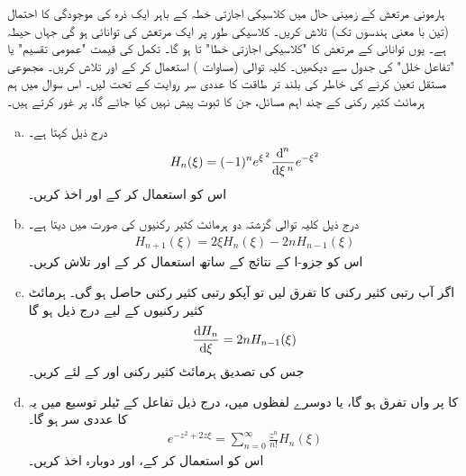 ہارمونی مرتعش کے زمینی حال میں کلاسیکی اجازتی خطہ کے باہر ایک ذرہ کی موجودگی کا احتمال (تین با معنی ہندسوں تک) تلاش کریں۔
 کلاسیکی طور پر ایک مرتعش کی توانائی  ہو گی جہاں  حیطہ ہے۔ یوں توانائی  کے مرتعش کا "کلاسیکی اجازتی خطا"  تا  ہو گا۔ تکمل کی قیمت "عمومی تقسیم" یا "تفاعل خلل" کی جدول سے دیکھیں۔
%
کلیہ توالی (مساوات ) استعمال کر کے  اور 
تلاش کریں۔ مجموعی مستقل تعین کرنے کی خاطر  کی بلند تر طاقت کا عددی سر روایت کے تحت  لیں۔
%
اس سوال میں ہم ہرمائٹ کثیر رکنی کے چند اہم مسائل، جن کا ثبوت پیش نہیں کیا جائے گا، پر غور کرتے ہیں۔
\begin{enumerate}[a.]
\item
{} درج ذیل کہتا ہے۔
\begin{align}
H_{n}(\xi)=(-1)^{n}e^{\xi^{\,2}}\frac{\dif^{\,n} }{\dif \xi^{\,n}}e^{-\xi^{2}}
\end{align}
اس کو استعمال کر کے  اور  اخذ کریں۔
\item
درج ذیل کلیہ توالی گزشتہ دو ہرمائٹ کثیر رکنیوں کی صورت میں  دیتا ہے۔
\begin{align}
H_{n+1}(\xi)=2\xi H_{n}(\xi)-2nH_{n-1}(\xi)
\end{align}
اس کو جزو-ا کے نتائج کے ساتھ استعمال کر کے  اور  تلاش کریں۔
\item
اگر آپ  رتبی کثیر رکنی کا تفرق لیں تو آپکو  رتبی کثیر رکنی حاصل ہو گی۔ ہرمائٹ کثیر رکنیوں کے لیے درج ذیل ہو گا
\begin{align}
\frac{\dif{H_{n}}}{\dif{\xi}}=2nH_{n-1}(\xi)
\end{align}
جس کی تصدیق ہرمائٹ کثیر رکنی  اور  کے لئے کریں۔ 
\item
{}  کا  پر  واں تفرق  ہو گا، یا دوسرے لفظوں میں، درج ذیل تفاعل کے ٹیلر  توسیع  میں یہ
 کا عددی سر ہو گا۔
\begin{align}
e^{-z^{2}+2z\xi}=\sum_{n=0}^{\infty}\frac{z^{n}}{n!}H_{n}(\xi)
\end{align}
اس کو استعمال کر کے،  اور  دوبارہ اخذ کریں۔
\end{enumerate}

